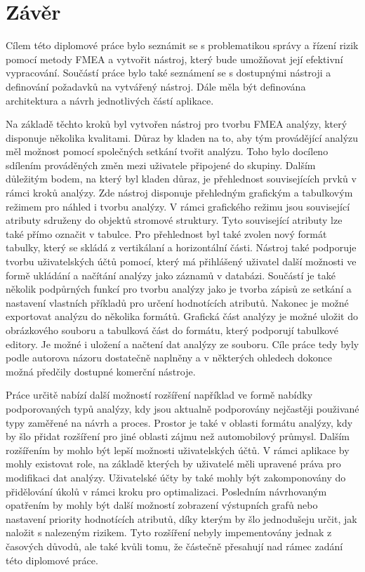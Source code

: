 \chapter{Závěr}
\label{sec:zaver}
Cílem této diplomové práce bylo seznámit se s problematikou správy a řízení rizik pomocí metody FMEA a vytvořit nástroj, který bude umožňovat její efektivní vypracování. Součástí práce bylo také seznámení se s dostupnými nástroji a definování požadavků na vytvářený nástroj. Dále měla být definována architektura a návrh jednotlivých částí aplikace. 

Na základě těchto kroků byl vytvořen nástroj pro tvorbu FMEA analýzy, který disponuje několika kvalitami. Důraz by kladen na to, aby tým provádějící analýzu měl možnost pomocí společných setkání tvořit analýzu. Toho bylo docíleno sdílením prováděných změn mezi uživatele připojené do skupiny. Dalším důležitým bodem, na který byl kladen důraz, je přehlednost souvisejících prvků v rámci kroků analýzy. Zde nástroj disponuje přehledným grafickým a tabulkovým režimem pro náhled i tvorbu analýzy. V rámci grafického režimu jsou související atributy sdruženy do objektů stromové struktury. Tyto související atributy lze také přímo označit v tabulce. Pro přehlednost byl také zvolen nový formát tabulky, který se skládá z vertikálaní a horizontální části. Nástroj také podporuje tvorbu uživatelských účtů pomocí, který má přihlášený uživatel další možnosti ve formě ukládání a načítání analýzy jako záznamů v databázi. Součástí je také několik podpůrných funkcí pro tvorbu analýzy jako je tvorba zápisů ze setkání a nastavení vlastních příkladů pro určení  hodnotících atributů. Nakonec je možné exportovat analýzu do několika formátů. Grafická část analýzy je možné uložit do obrázkového souboru a tabulková část do formátu, který podporují tabulkové editory. Je možné i uložení a načtení dat analýzy ze souboru. Cíle práce tedy byly podle autorova názoru dostatečně naplněny a v některých ohledech dokonce možná předčily dostupné komerční nástroje. 

Práce určitě nabízí další možností rozšíření například ve formě nabídky podporovaných typů analýzy, kdy jsou aktualně podporovány nejčastěji použivané typy zaměřené na návrh a proces. Prostor je také v oblasti formátu analýzy, kdy by šlo přidat rozšíření pro jiné oblasti zájmu než automobilový průmysl. Dalším rozšířením by mohlo být lepší možnosti uživatelských účtů. V rámci aplikace by mohly existovat role, na základě kterých by uživatelé měli upravené práva pro modifikaci dat analýzy. Uživatelské účty by také mohly být zakomponovány do přidělování úkolů v rámci kroku pro optimalizaci. Posledním návrhovaným opatřením by mohly být další možností zobrazení výstupních grafů nebo nastavení priority hodnotících atributů, díky kterým by šlo jednodušeju určit, jak naložit s nalezeným rizikem. Tyto rozšíření nebyly impementovány jednak z časových důvodů, ale také kvůli tomu, že částečně přesahují nad rámec zadání této diplomové práce.